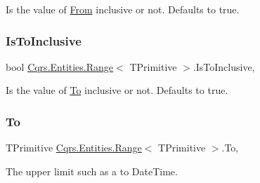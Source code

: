 Is the value of \hyperlink{classCqrs_1_1Entities_1_1Range_a373db08544a25cb6d53411f56e0e072a}{From} inclusive or not. Defaults to true. 

\mbox{\label{classCqrs_1_1Entities_1_1Range_a14cc90fd0525d94b2f3d4c69f19d013e}} 
\subsubsection{\texorpdfstring{Is\+To\+Inclusive}{IsToInclusive}}
{\footnotesize\ttfamily bool \hyperlink{classCqrs_1_1Entities_1_1Range}{Cqrs.\+Entities.\+Range}$<$ T\+Primitive $>$.Is\+To\+Inclusive\hspace{0.3cm}{\ttfamily [get]}, {\ttfamily [set]}}



Is the value of \hyperlink{classCqrs_1_1Entities_1_1Range_a06daca38005d4f4ff2156b99a95d2f92}{To} inclusive or not. Defaults to true. 

\mbox{\label{classCqrs_1_1Entities_1_1Range_a06daca38005d4f4ff2156b99a95d2f92}} 
\subsubsection{\texorpdfstring{To}{To}}
{\footnotesize\ttfamily T\+Primitive \hyperlink{classCqrs_1_1Entities_1_1Range}{Cqrs.\+Entities.\+Range}$<$ T\+Primitive $>$.To\hspace{0.3cm}{\ttfamily [get]}, {\ttfamily [set]}}



The upper limit such as a to Date\+Time. 

